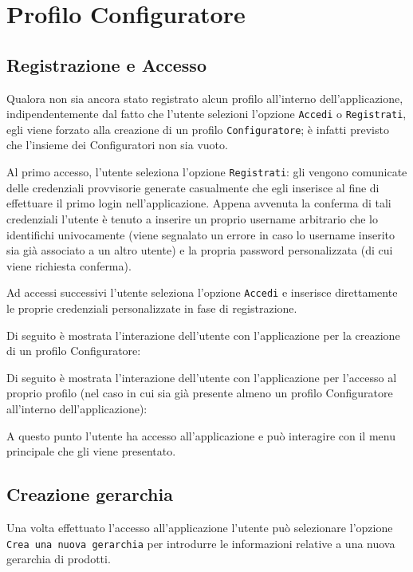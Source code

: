 \section{Profilo Configuratore}

\subsection{Registrazione e Accesso}
Qualora non sia ancora stato registrato alcun profilo all'interno dell'applicazione, indipendentemente dal fatto che l'utente selezioni l'opzione \texttt{Accedi} o \texttt{Registrati}, egli viene forzato alla creazione di un profilo \texttt{Configuratore}; è infatti previsto che l'insieme dei Configuratori non sia vuoto.  

Al primo accesso, l'utente seleziona l'opzione \texttt{Registrati}: gli vengono comunicate delle credenziali provvisorie generate casualmente che egli inserisce al fine di effettuare il primo login nell'applicazione. Appena avvenuta la conferma di tali credenziali l'utente è tenuto a inserire un proprio username arbitrario che lo identifichi univocamente (viene segnalato un errore in caso lo username inserito sia già associato a un altro utente) e la propria password personalizzata (di cui viene richiesta conferma). 

Ad accessi successivi l'utente seleziona l'opzione \texttt{Accedi} e inserisce direttamente le proprie credenziali personalizzate in fase di registrazione. \bigskip

Di seguito è mostrata l'interazione dell'utente con l'applicazione per la creazione di un profilo Configuratore:



Di seguito è mostrata l'interazione dell'utente con l'applicazione per l'accesso al proprio profilo (nel caso in cui sia già presente almeno un profilo Configuratore all'interno dell'applicazione):


A questo punto l'utente ha accesso all'applicazione e può interagire con il menu principale che gli viene presentato.

\subsection{Creazione gerarchia}
Una volta effettuato l'accesso all'applicazione l'utente può selezionare l'opzione \texttt{Crea una nuova gerarchia} per introdurre le informazioni relative a una nuova gerarchia di prodotti. 

